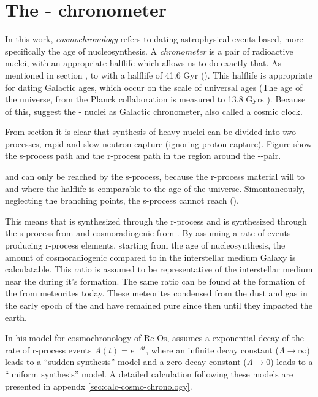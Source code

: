 \section{The - chronometer}
In this work, \textit{cosmochronology} refers to dating astrophysical events based, more specifically the age of nucleosynthesis.
A \textit{chronometer} is a pair of radioactive nuclei, with an appropriate halflife which allows us to do exactly that.
As mentioned in section ,   to  with a halflife of 41.6 Gyr ().
This halflife is appropriate for dating Galactic ages, which occur on the scale of universal ages (The age of the universe, from the Planck collaboration is measured to 13.8 Gyrs ).
Because of this,  suggest the - nuclei as Galactic chronometer, also called a cosmic clock.

From section  it is clear that synthesis of heavy nuclei can be divided into two processes, rapid and slow neutron capture (ignoring proton capture).
Figure  show the s-process path and the r-process path in the region around the --pair.

 and  can only be reached by the s-process, because the r-process material will \betadecay to  and  where the halflife is comparable to the age of the universe. Simontaneously, neglecting the  branching points, the s-process cannot reach  ().

This means that  is synthesized through the r-process and  is synthesized through the s-process from  and cosmoradiogenic \betadecay from .
By assuming a rate of events producing r-process elements, starting from the age of nucleosynthesis, the amount of cosmoradiogenic  compared to  in the interstellar medium Galaxy is calculatable.
This ratio is assumed to be representative of the interstellar medium near the \sos during it's formation.
The same ratio can be found at the formation of the \sos from meteorites today. These meteorites condensed from the dust and gas in the early epoch of the \sos and have remained pure since then until they impacted the earth.

In his model for cosmochronology of Re-Os,  assumes a exponential decay of the rate of r-process events $A(t) = e^{-\Lambda t}$, where an infinite decay constant ($\Lambda\rightarrow\infty$) leads to a ``sudden synthesis'' model and a zero decay constant ($\Lambda\rightarrow 0$) leads to a ``uniform synthesis'' model.
A detailed calculation following these models are presented in appendx \ref{sec:calc-cosmo-chronology}.


